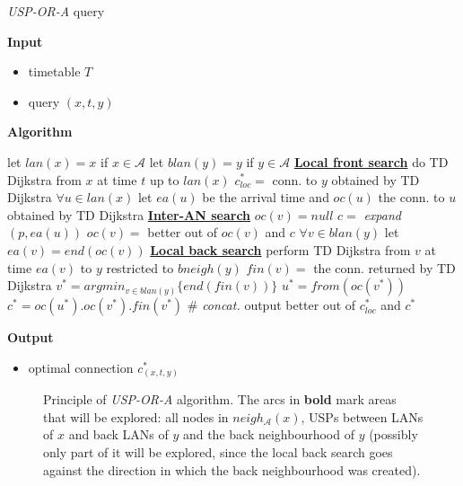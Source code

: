 \documentclass{svk_long_en}
\newcommand{\cmt}[1]{{\color{cmt-clr} \hspace*{1cm} \# \textit{#1}}}
\newcommand{\algsec}[1]{\textcolor{algsec-clr}{\textbf{\underline{#1}}}}
\newcommand{\inputTikZ}[1]{%
    \beginpgfgraphicnamed{#1-external}%
    \endpgfgraphicnamed%
}
\begin{document}
		\color{algcolor}
		\begin{algorithm}[H]
			\color{inalgcolor}
			\caption{\textit{USP-OR-A} query}
			\label{alg:uspora-query}
			\textbf{Input} 
			\begin{itemize}
				\item timetable $T$
				\item query $(x, t, y)$
			\end{itemize}
			\textbf{Algorithm}
			\begin{algorithmic}
				\STATE let $lan(x) = x$ if $x \in \mathcal{A}$
				\STATE let $blan(y) = y$ if $y \in \mathcal{A}$
				\STATE \algsec{Local front search}
				\STATE do TD Dijkstra from $x$ at time $t$ up to $lan(x)$
					\STATE $c_{loc}^{*} =$ conn. to $y$ obtained by TD Dijkstra
				\ENDIF
				\STATE $\forall u \in lan(x)$ let $ea(u)$ be the arrival time and $oc(u)$ the conn. to $u$ obtained by TD Dijkstra
				\STATE \algsec{Inter-AN search}
					\STATE $oc(v) = null$
							\STATE $c =$ \textit{expand}$(p, ea(u))$
							\STATE $oc(v) =$ better out of $oc(v)$ and $c$
						\ENDFOR
					\ENDFOR
				\ENDFOR
				\STATE $\forall v \in blan(y)$ let $ea(v) = end(oc(v))$
				\STATE \algsec{Local back search}
					\STATE perform TD Dijkstra from $v$ at time $ea(v)$ to $y$ restricted to $bneigh(y)$
					\STATE $fin(v) =$ the conn. returned by TD Dijkstra	
				\ENDFOR
				\STATE $v^{*} = argmin_{v \in blan(y)} \{end(fin(v))\}$
				\STATE $u^{*} = from(oc(v^{*}))$
				\STATE $c^{*} = oc(u^{*}) . oc(v^{*}) . fin(v^{*})$ \cmt{concat.}
				\STATE output better out of $c_{loc}^{*}$ and $c^{*}$
			\end{algorithmic}
			\textbf{Output}
			\begin{itemize}
				\item optimal connection $c_{(x, t, y)}^{*}$
			\end{itemize}
		\end{algorithm}
		\color{black}
		
		\begin{figure}[h!]
			\begin{center}
				\scriptsize
				\inputTikZ{./tikzpics/uspora}
			\end{center}
			\caption{\label{fig:uspora} Principle of \textit{USP-OR-A} algorithm. The arcs in \textbf{bold} mark areas that will be explored: all nodes in $neigh_{\mathcal{A}}(x)$, USPs between LANs of $x$ and back LANs of $y$ and the back neighbourhood of $y$ (possibly only part of it will be explored, since the local back search goes against the direction in which the back neighbourhood was created).}
		\end{figure}
		
\end{document}
